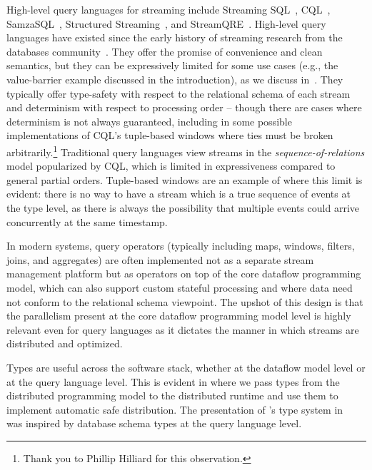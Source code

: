 High-level query languages for streaming include Streaming SQL~\cite{jain2008towards,begoli2019one}, CQL~\cite{arasu2003cql,ABW2006CQL}, SamzaSQL~\cite{pathirage2016samzasql}, Structured Streaming~\cite{armbrust2018structured},
and StreamQRE~\cite{StreamQRE}.
High-level query languages have existed since the early history
of streaming research from the databases community~\cite{stonebraker20058}.
They offer the promise of convenience and clean semantics, but they can be expressively limited for some use cases (e.g., the value-barrier example discussed in the introduction), as we discuss in~.
They typically offer type-safety with respect to the relational schema of each stream and determinism with respect to processing order --
though there are cases where determinism is not always guaranteed, including in some possible implementations of CQL's tuple-based windows where ties must be broken arbitrarily.\footnote{Thank you to Phillip Hilliard for this observation.}
Traditional query languages view streams in the \emph{sequence-of-relations} model popularized by CQL, which is limited in expressiveness compared to general partial orders.
Tuple-based windows are an example of where this limit is evident: there is no way to have a stream which is a true sequence of events at the type level, as there is always the possibility that multiple events could arrive concurrently at the same timestamp.

In modern systems, query operators (typically including maps, windows, filters, joins, and aggregates)
are often implemented not as a separate stream management platform but as
operators on top of the core dataflow programming model, which can also support custom stateful processing and where data need not conform to the relational schema viewpoint.
The upshot of this design is that the parallelism present at the core dataflow programming model level is highly relevant even for query languages as it dictates the manner in which streams are distributed and optimized.

Types are useful across the software stack, whether at the dataflow model level or at the query language level.
This is evident in  where we pass types from the distributed programming model to the distributed runtime and use them to implement automatic safe distribution.
The presentation of 's type system in~ was inspired by database schema types at the query language level.

